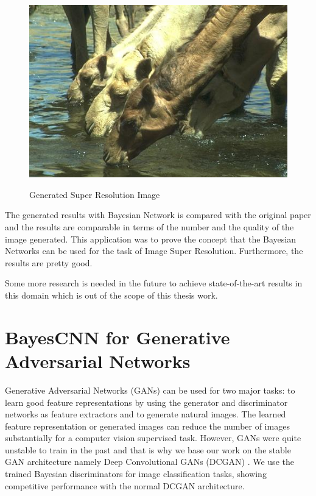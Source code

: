 \begin{figure}[H]
\begin{center}
\includegraphics{Chapter6/Figs/camel_LR.png}
\label{fig:CamelSR}
\caption{Generated Super Resolution Image}
\end{center}
\end{figure}

The generated results with Bayesian Network is compared with the original paper and the results are comparable in terms of the number and the quality of the image generated. This application was to prove the concept that the Bayesian Networks can be used for the task of Image Super Resolution. Furthermore, the results are pretty good. 

Some more research is needed in the future to achieve state-of-the-art results in this domain which is out of the scope of this thesis work.


\section{BayesCNN for Generative Adversarial Networks}

Generative Adversarial Networks (GANs) \cite{goodfellow2014generative} can be used for two major tasks: to learn good feature representations by using the generator and discriminator networks as feature extractors and to generate natural images. The learned feature representation or generated images can reduce the number of images substantially for a computer vision supervised task. However, GANs were quite unstable to train in the past and that is why we base our work on the stable GAN architecture namely Deep Convolutional GANs (DCGAN) \cite{DBLP:journals/corr/RadfordMC15}. We use the trained Bayesian discriminators for image classification tasks, showing competitive performance with the normal DCGAN architecture.

